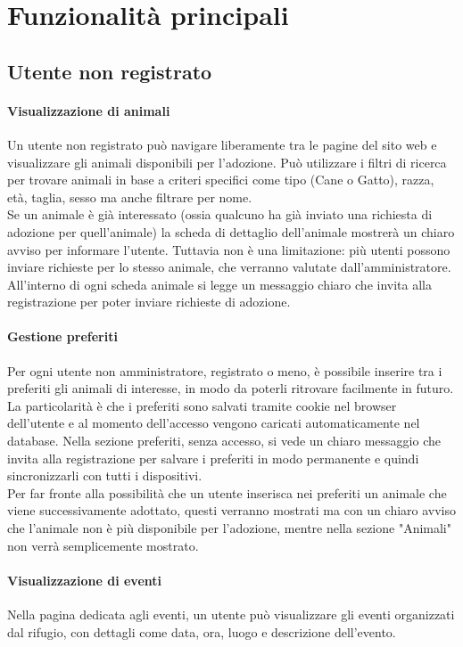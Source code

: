 \section{Funzionalità principali}
\subsection{Utente non registrato}
\paragraph{Visualizzazione di animali}
Un utente non registrato può navigare liberamente tra le pagine del sito web e visualizzare gli animali disponibili per l'adozione. Può utilizzare i filtri di ricerca per trovare animali in base a criteri specifici come tipo (Cane o Gatto), razza, età, taglia, sesso ma anche filtrare per nome.\\
Se un animale è già interessato (ossia qualcuno ha già inviato una richiesta di adozione per quell'animale) la scheda di dettaglio dell'animale mostrerà un chiaro avviso per informare l'utente. Tuttavia non è una limitazione: più utenti possono inviare richieste per lo stesso animale, che verranno valutate dall'amministratore.\\
All'interno di ogni scheda animale si legge un messaggio chiaro che invita alla registrazione per poter inviare richieste di adozione.
\paragraph{Gestione preferiti}
Per ogni utente non amministratore, registrato o meno, è possibile inserire tra i preferiti gli animali di interesse, in modo da poterli ritrovare facilmente in futuro.\\
La particolarità è che i preferiti sono salvati tramite cookie nel browser dell'utente e al momento dell'accesso vengono caricati automaticamente nel database. Nella sezione preferiti, senza accesso, si vede un chiaro messaggio che invita alla registrazione per salvare i preferiti in modo permanente e quindi sincronizzarli con tutti i dispositivi.\\
Per far fronte alla possibilità che un utente inserisca nei preferiti un animale che viene successivamente adottato, questi verranno mostrati ma con un chiaro avviso che l'animale non è più disponibile per l'adozione, mentre nella sezione "Animali" non verrà semplicemente mostrato.
\paragraph{Visualizzazione di eventi}
Nella pagina dedicata agli eventi, un utente può visualizzare gli eventi organizzati dal rifugio, con dettagli come data, ora, luogo e descrizione dell'evento.
